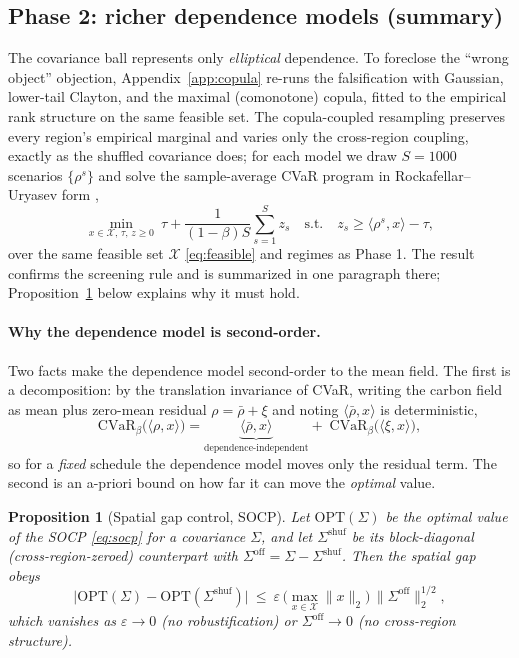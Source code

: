 \documentclass[12pt]{article}
\newtheorem{proposition}{Proposition}
\newcommand{\CVaR}{\mathrm{CVaR}}
\begin{document}
\subsection{Phase 2: richer dependence models (summary)}\label{sec:method-copula}
The covariance ball represents only \emph{elliptical} dependence. To foreclose the
``wrong object'' objection, Appendix~\ref{app:copula} re-runs the falsification with
Gaussian, lower-tail Clayton, and the maximal (comonotone) copula, fitted to the
empirical rank structure on the same feasible set. The copula-coupled resampling
preserves every region's empirical marginal and varies only the cross-region coupling,
exactly as the shuffled covariance does; for each model we draw $S=1000$ scenarios
$\{\rho^s\}$ and solve the sample-average CVaR program in Rockafellar--Uryasev form
\citep{rockafellar2000},
\begin{equation}
\min_{x\in\mathcal X,\,\tau,\,z\ge0}\ \tau+\frac{1}{(1-\beta)S}\sum_{s=1}^S z_s
\quad\text{s.t.}\quad z_s\ge\langle\rho^s,x\rangle-\tau,
\label{eq:saacvar}
\end{equation}
over the same feasible set $\mathcal X$ \eqref{eq:feasible} and regimes as Phase 1.
The result confirms the screening rule and is summarized in one paragraph there;
Proposition~\ref{prop:meandom} below explains why it must hold.

\paragraph{Why the dependence model is second-order.} Two facts make the
dependence model second-order to the mean field. The first is a decomposition: by
the translation invariance of CVaR, writing the carbon field as mean plus zero-mean
residual $\rho=\bar\rho+\xi$ and noting $\langle\bar\rho,x\rangle$ is deterministic,
\begin{equation}
\CVaR_\beta\!\big(\langle\rho,x\rangle\big)=
\underbrace{\langle\bar\rho,x\rangle}_{\text{dependence-independent}}+\;
\CVaR_\beta\!\big(\langle\xi,x\rangle\big),
\label{eq:meandom}
\end{equation}
so for a \emph{fixed} schedule the dependence model moves only the residual term.
The second is an a-priori bound on how far it can move the \emph{optimal} value.

\begin{proposition}[Spatial gap control, SOCP]\label{prop:meandom}
Let $\mathrm{OPT}(\Sigma)$ be the optimal value of the SOCP \eqref{eq:socp} for a
covariance $\Sigma$, and let $\Sigma^{\mathrm{shuf}}$ be its block-diagonal
(cross-region-zeroed) counterpart with $\Sigma^{\mathrm{off}}=\Sigma-
\Sigma^{\mathrm{shuf}}$. Then the spatial gap obeys
\begin{equation}
\big|\mathrm{OPT}(\Sigma)-\mathrm{OPT}(\Sigma^{\mathrm{shuf}})\big|\ \le\
\varepsilon\,\Big(\max_{x\in\mathcal X}\lVert x\rVert_2\Big)\,
\big\lVert\Sigma^{\mathrm{off}}\big\rVert_2^{1/2},
\label{eq:propbound}
\end{equation}
which vanishes as $\varepsilon\to0$ (no robustification) or
$\Sigma^{\mathrm{off}}\to0$ (no cross-region structure).
\end{proposition}
\end{document}
